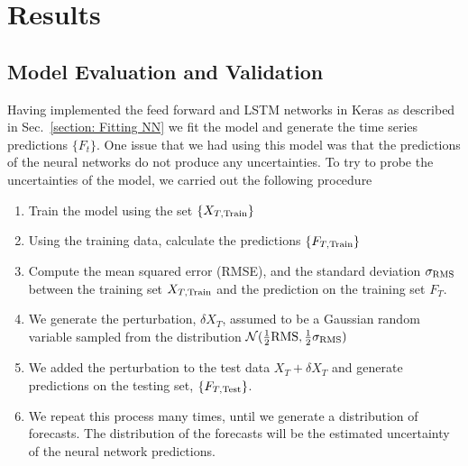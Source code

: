\documentclass[10pt,a4paper]{article}
\begin{document}
\section{Results}
%
\subsection{Model Evaluation and Validation}
%
Having implemented the feed forward and LSTM networks in Keras as described in Sec.~\ref{section: Fitting NN} we fit the model and generate the time series predictions $\lbrace F_t \rbrace$. One issue that we had using this model was that the predictions of the neural networks do not produce any uncertainties. To try to probe the uncertainties of the model, we carried out the following procedure \\
\begin{enumerate}
\item Train the model using the set $\lbrace X_{T,{\rm Train}} \rbrace$
\item Using the training data, calculate the predictions $\lbrace F_{T,{\rm Train}} \rbrace$
\item Compute the mean squared error (RMSE), and the standard deviation $\sigma_{\rm RMS}$ between the training set $X_{T,{\rm Train}}$ and the prediction on the training set $F_T$.
\item We generate the perturbation, $\delta X_{T}$, assumed to be a Gaussian random variable sampled from the distribution $ \mathcal{N}(\frac{1}{2}{\rm RMS},\frac{1}{2}\sigma_{\rm RMS} )$
\item We added the perturbation to the test data $X_T +\delta X_{T}$ and generate predictions on the testing set, $\lbrace F_{T,{\rm Test}} \rbrace$.
\item We repeat this process many times, until we generate a distribution of forecasts. The distribution of the forecasts will be the estimated uncertainty of the neural network predictions.
\end{enumerate}
\end{document}

